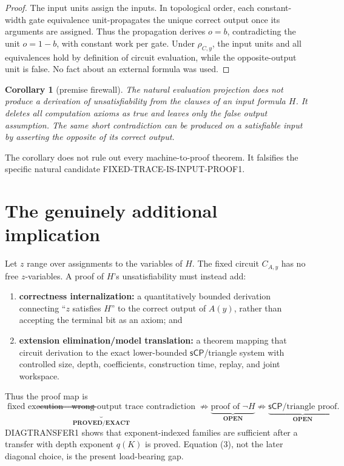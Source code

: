 \documentclass[11pt]{article}
\newtheorem{corollary}[theorem]{Corollary}
\newcommand{\sCP}{\mathsf{sCP}}
\newcommand{\EXACT}{\textbf{PROVED/EXACT}}
\newcommand{\OPEN}{\textbf{OPEN}}
\begin{document}
\begin{proof}
The input units assign the inputs.  In topological order, each constant-width
gate equivalence unit-propagates the unique correct output once its arguments
are assigned.  Thus the propagation derives \(o=b\), contradicting the unit
\(o=1-b\), with constant work per gate.  Under \(\rho_{C,y}\), the input units
and all equivalences hold by definition of circuit evaluation, while the
opposite-output unit is false.  No fact about an external formula was used.
\end{proof}

\begin{corollary}[premise firewall]
The natural evaluation projection does not produce a derivation of
unsatisfiability from the clauses of an input formula \(H\).  It deletes all
computation axioms as true and leaves only the false output assumption.  The
same short contradiction can be produced on a satisfiable input by asserting
the opposite of its correct output.
\end{corollary}

The corollary does not rule out every machine-to-proof theorem.  It falsifies
the specific natural candidate \textsf{FIXED-TRACE-IS-INPUT-PROOF1}.

\section{The genuinely additional implication}
Let \(z\) range over assignments to the variables of \(H\).  The fixed
circuit \(C_{A,y}\) has no free \(z\)-variables.  A proof of \(H\)'s
unsatisfiability must instead add:
\begin{enumerate}
\item \textbf{correctness internalization:} a quantitatively bounded
  derivation connecting ``\(z\) satisfies \(H\)'' to the correct output of
  \(A(y)\), rather than accepting the terminal bit as an axiom; and
\item \textbf{extension elimination/model translation:} a theorem mapping
  that circuit derivation to the exact lower-bounded \(\sCP\)/triangle system
  with controlled size, depth, coefficients, construction time, replay, and
  joint workspace.
\end{enumerate}
Thus the proof map is
\[
 \underbrace{\text{fixed execution}\Rightarrow
 \text{wrong-output trace contradiction}}_{\EXACT}
 \not\Rightarrow
 \underbrace{\text{proof of }\neg H}_{\OPEN}
 \not\Rightarrow
 \underbrace{\sCP\text{/triangle proof}}_{\OPEN}.              \tag{3}
\]
DIAGTRANSFER1 shows that exponent-indexed families are sufficient after a
transfer with depth exponent \(q(K)\) is proved.  Equation (3), not the later
diagonal choice, is the present load-bearing gap.
\end{document}
